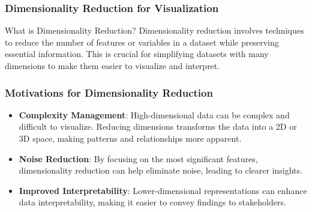 \documentclass[aspectratio=169]{beamer}
\begin{document}
\begin{frame}[fragile]
    \frametitle{Dimensionality Reduction for Visualization}
    \begin{block}{What is Dimensionality Reduction?}
        Dimensionality reduction involves techniques to reduce the number of features or variables in a dataset while preserving essential information. This is crucial for simplifying datasets with many dimensions to make them easier to visualize and interpret.
    \end{block}
\end{frame}

\begin{frame}[fragile]
    \frametitle{Motivations for Dimensionality Reduction}
    \begin{itemize}
        \item \textbf{Complexity Management}: High-dimensional data can be complex and difficult to visualize. Reducing dimensions transforms the data into a 2D or 3D space, making patterns and relationships more apparent.
        \item \textbf{Noise Reduction}: By focusing on the most significant features, dimensionality reduction can help eliminate noise, leading to clearer insights.
        \item \textbf{Improved Interpretability}: Lower-dimensional representations can enhance data interpretability, making it easier to convey findings to stakeholders.
    \end{itemize}
\end{frame}
\end{document}

